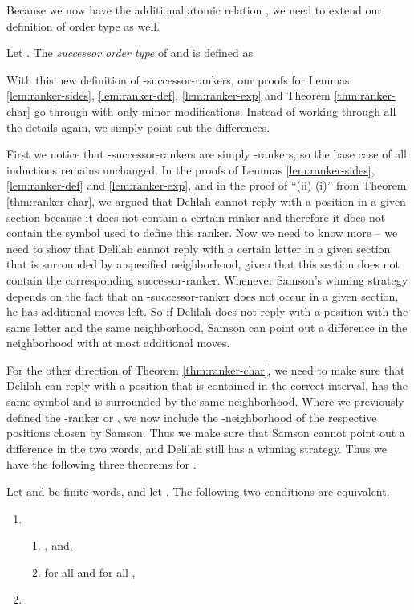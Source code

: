 \documentclass{LMCS}
\begin{document}
Because we now have the additional atomic relation , we need to extend
our definition of order type as well.

\begin{defi} \label{def:suc-order-type} Let . The
  \emph{successor order type} of  and  is defined as
  
\end{defi}

With this new definition of -successor-rankers, our proofs for Lemmas
\ref{lem:ranker-sides}, \ref{lem:ranker-def}, \ref{lem:ranker-exp} and
Theorem \ref{thm:ranker-char} go through with only minor modifications.
Instead of working through all the details again, we simply point out the
differences.

First we notice that -successor-rankers are simply -rankers, so the
base case of all inductions remains unchanged. In the proofs of Lemmas
\ref{lem:ranker-sides}, \ref{lem:ranker-def} and \ref{lem:ranker-exp}, and
in the proof of ``(ii)  (i)'' from Theorem \ref{thm:ranker-char},
we argued that Delilah cannot reply with a position in a given section
because it does not contain a certain ranker and therefore it does not
contain the symbol used to define this ranker. Now we need to know more --
we need to show that Delilah cannot reply with a certain letter in a given
section that is surrounded by a specified neighborhood, given that this
section does not contain the corresponding successor-ranker. Whenever
Samson's winning strategy depends on the fact that an -successor-ranker
does not occur in a given section, he has  additional moves left. So if
Delilah does not reply with a position with the same letter and the same
neighborhood, Samson can point out a difference in the neighborhood with at
most  additional moves.

For the other direction of Theorem \ref{thm:ranker-char}, we need to make
sure that Delilah can reply with a position that is contained in the correct
interval, has the same symbol and is surrounded by the same neighborhood.
Where we previously defined the -ranker  or , we now include the
-neighborhood of the respective positions chosen by Samson. Thus we
make sure that Samson cannot point out a difference in the two words, and
Delilah still has a winning strategy. Thus we have the following three
theorems for .


\begin{thm}
  \label{thm:suc-structure}
  Let  and  be finite words, and let . The following two
  conditions are equivalent.
  \begin{enumerate}[\em(i)]
  \item
    \begin{enumerate}[\em(a)]
    \item , and,
    \item for all  and for all ,\\
      
    \end{enumerate}
  \item 
  \end{enumerate}
\end{thm}
\end{document}
